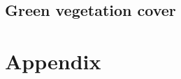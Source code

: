 \documentclass{myreport}
\begin{document}


\subsection{Green vegetation cover}



\clearpage


\section{Appendix}
\end{document}
